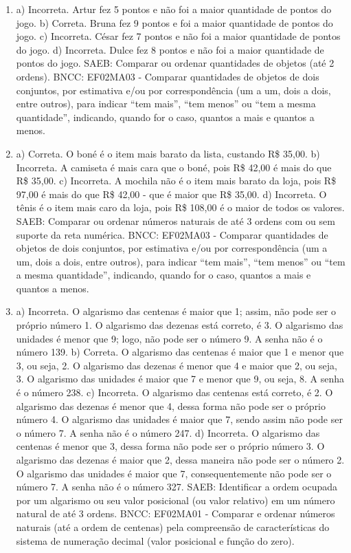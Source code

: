 
\begin{enumerate}
\item
a) Incorreta. Artur fez 5 pontos e não foi a maior quantidade de pontos do jogo.
b) Correta. Bruna fez 9 pontos e foi a maior quantidade de pontos do jogo.
c) Incorreta. César fez 7 pontos e não foi a maior quantidade de pontos do jogo.
d) Incorreta. Dulce fez 8 pontos e não foi a maior quantidade de pontos do jogo.
SAEB: Comparar ou ordenar quantidades de objetos (até 2 ordens).
BNCC: EF02MA03 - Comparar quantidades de objetos de dois conjuntos, por
estimativa e/ou por correspondência (um a um, dois a dois, entre
outros), para indicar ``tem mais'', ``tem menos'' ou ``tem a mesma
quantidade'', indicando, quando for o caso, quantos a mais e quantos a
menos.

\item
a) Correta. O boné é o item mais barato da lista, custando R\$ 35,00.
b) Incorreta. A camiseta é mais cara que o boné, pois R\$ 42,00 é mais do que R\$ 35,00.
c) Incorreta. A mochila não é o item mais barato da loja, pois R\$ 97,00 é mais do que R\$ 42,00 - que é maior que R\$ 35,00.
d) Incorreta. O tênis é o item mais caro da loja, pois R\$ 108,00 é o maior de todos os valores.
SAEB: Comparar ou ordenar números naturais de até 3 ordens com
ou sem suporte da reta numérica.
BNCC: EF02MA03 - Comparar quantidades de objetos de dois conjuntos, por
estimativa e/ou por correspondência (um a um, dois a dois, entre
outros), para indicar ``tem mais'', ``tem menos'' ou ``tem a mesma
quantidade'', indicando, quando for o caso, quantos a mais e quantos a
menos.

\item
a) Incorreta. O algarismo das centenas é maior que 1; assim, não
pode ser o próprio número 1. O algarismo das dezenas está correto, é 3.
O algarismo das unidades é menor que 9; logo, não pode ser o número 9. A senha não é o número 139.
b) Correta. O algarismo das centenas é maior que 1 e menor que 3, ou
seja, 2. O algarismo das dezenas é menor que 4 e maior que 2, ou seja,
3. O algarismo das unidades é maior que 7 e menor que 9, ou seja, 8. A
senha é o número 238.
c) Incorreta. O algarismo das centenas está correto, é 2. O algarismo
das dezenas é menor que 4, dessa forma não pode ser o próprio número 4.
O algarismo das unidades é maior que 7, sendo assim não pode ser o
número 7. A senha não é o número 247.
d) Incorreta. O algarismo das centenas é menor que 3, dessa forma não
pode ser o próprio número 3. O algarismo das dezenas é maior que 2,
dessa maneira não pode ser o número 2. O algarismo das unidades é maior
que 7, consequentemente não pode ser o número 7. A senha não é o número
327.
SAEB: Identificar a ordem ocupada por um algarismo ou seu valor
posicional (ou valor relativo) em um número natural de até 3 ordens.
BNCC: EF02MA01 - Comparar e ordenar números naturais (até a ordem de
centenas) pela compreensão de características do sistema de numeração
decimal (valor posicional e função do zero).


\end{enumerate}
